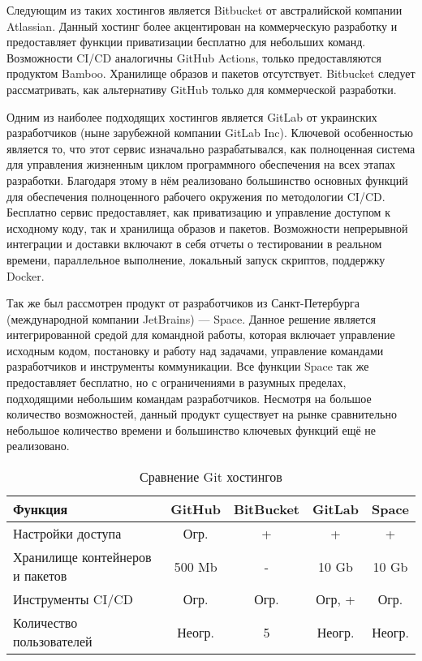 Следующим из таких хостингов является Bitbucket\cite{web:bitbucket} от австралийской компании Atlassian.
Данный хостинг более акцентирован на коммерческую разработку и предоставляет функции приватизации бесплатно для небольших команд.
Возможности CI/CD аналогичны GitHub Actions, только предоставляются продуктом Bamboo.
Хранилище образов и пакетов отсутствует.
Bitbucket следует рассматривать, как альтернативу GitHub только для коммерческой разработки\cite{web:github:docs}.

Одним из наиболее подходящих хостингов является GitLab от украинских разработчиков (ныне зарубежной компании GitLab Inc).
Ключевой особенностью является то, что этот сервис изначально разрабатывался,
как полноценная система для управления жизненным циклом программного обеспечения на всех этапах разработки.
Благодаря этому в нём реализовано большинство основных функций для обеспечения полноценного рабочего окружения по методологии CI/CD.
Бесплатно сервис предоставляет, как приватизацию и управление доступом к исходному коду, так и хранилища образов и пакетов.
Возможности непрерывной интеграции и доставки включают в себя отчеты о тестировании в реальном времени, параллельное выполнение, локальный запуск скриптов, поддержку Docker\cite{web:gitlab}.

Так же был рассмотрен продукт от разработчиков из Санкт-Петербурга (международной компании JetBrains) --- Space\cite{web:space:docs}.
Данное решение является интегрированной средой для командной работы, которая включает управление исходным кодом, постановку и работу над задачами, управление командами разработчиков и инструменты коммуникации.
Все функции Space так же предоставляет бесплатно, но с ограничениями в разумных пределах, подходящими небольшим командам разработчиков.
Несмотря на большое количество возможностей, данный продукт существует на рынке сравнительно небольшое количество времени и большинство ключевых функций ещё не реализовано.

\begin{center}
    \begin{longtable}{|p{}|c|c|c|c|}
        \caption{Сравнение Git хостингов}
        \label{tab:git-hostings}
        \hline
        Функция                             & GitHub          & BitBucket   & GitLab    & Space \\
        \hline
        Настройки доступа                   & Огр.            & +           & +         & +     \\
        Хранилище контейнеров и пакетов     & 500 Mb          & -           & 10 Gb     & 10 Gb \\
        Инструменты CI/CD                   & Огр.            & Огр.        & Огр, +    & Огр.  \\
        Количество пользователей            & Неогр.          & 5           & Неогр.    & Неогр.\\
        \hline
    \end{longtable}
\end{center}

